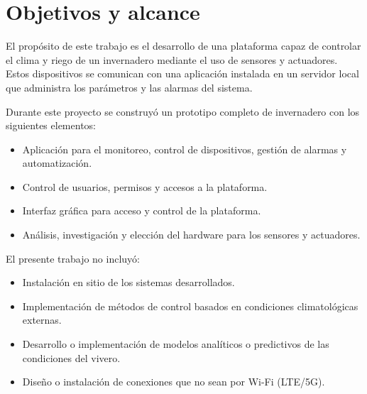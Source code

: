 
\section{Objetivos y alcance}


El propósito de este trabajo es el desarrollo de una plataforma capaz de controlar el clima y riego de un invernadero mediante el uso de sensores y actuadores. Estos dispositivos se comunican con una aplicación instalada en un servidor local que administra los parámetros y las alarmas del sistema.

Durante este proyecto se construyó un prototipo completo de invernadero con los siguientes elementos:
 
\begin{itemize}
	\item Aplicación para el monitoreo, control de dispositivos, gestión de alarmas y automatización.
	\item Control de usuarios, permisos y accesos a la plataforma.
	\item Interfaz gráfica para acceso y control de la plataforma.
	\item Análisis, investigación y elección del hardware para los sensores y actuadores.


\end{itemize}


El presente trabajo no incluyó:
\begin{itemize}
	\item Instalación en sitio de los sistemas desarrollados.
	\item Implementación de métodos de control basados en condiciones climatológicas externas.
	\item Desarrollo o implementación de modelos analíticos o predictivos de las condiciones del vivero.
	\item Diseño o instalación de conexiones que no sean por Wi-Fi (LTE/5G). 
	
\end{itemize}